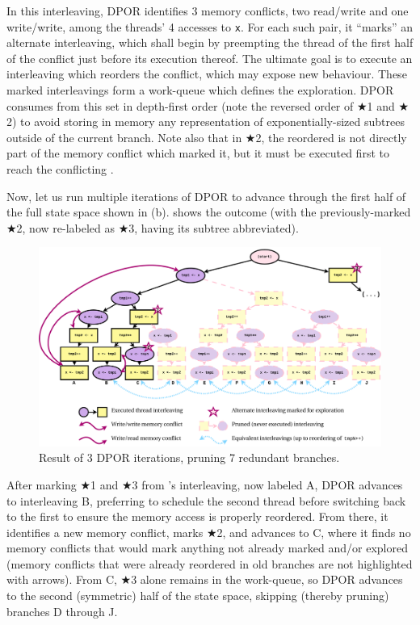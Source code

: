 In this interleaving, DPOR identifies 3 memory conflicts, two read/write and one write/write,
among the threads' 4 accesses to {\tt x}.
For each such pair, it ``marks'' an alternate interleaving,
which shall begin by preempting the thread of the first half of the conflict just before its execution thereof.
The ultimate goal is to execute an interleaving which reorders the conflict, which may expose new behaviour.
These marked interleavings form a work-queue which defines the exploration.
DPOR consumes from this set in depth-first order
(note the reversed order of $\bigstar$1 and $\bigstar$2)
to avoid storing in memory any representation of exponentially-sized subtrees outside of the current branch.
Note also that in $\bigstar$2,
the reordered  is not directly part of the memory conflict which marked it,
but it must be executed first to reach the conflicting .

Now, let us run multiple iterations of DPOR
to advance through the first half of the full state space shown in (b).
 shows the outcome
(with the previously-marked $\bigstar$2, now re-labeled as $\bigstar$3, having its subtree abbreviated).

\begin{figure}[h]
	\begin{center}
		\includegraphics[width=\textwidth]{dpor-example-1.pdf}
	\end{center}
	\caption{Result of 3 DPOR iterations, pruning 7 redundant branches.}
	\label{fig:dpor-example-1}
\end{figure}

After marking $\bigstar$1 and $\bigstar$3 from 's interleaving, now labeled A,
DPOR advances to interleaving B, preferring to schedule the second thread before switching back to the first
to ensure the memory access is properly reordered.
From there, it identifies a new memory conflict, marks $\bigstar$2, and advances to C,
where it finds no memory conflicts that would mark anything not already marked and/or explored
(memory conflicts that were already reordered in old branches are not highlighted with arrows).
From C, $\bigstar$3 alone remains in the work-queue,
so DPOR advances to the second (symmetric) half of the state space,
skipping (thereby pruning) branches D through J.

